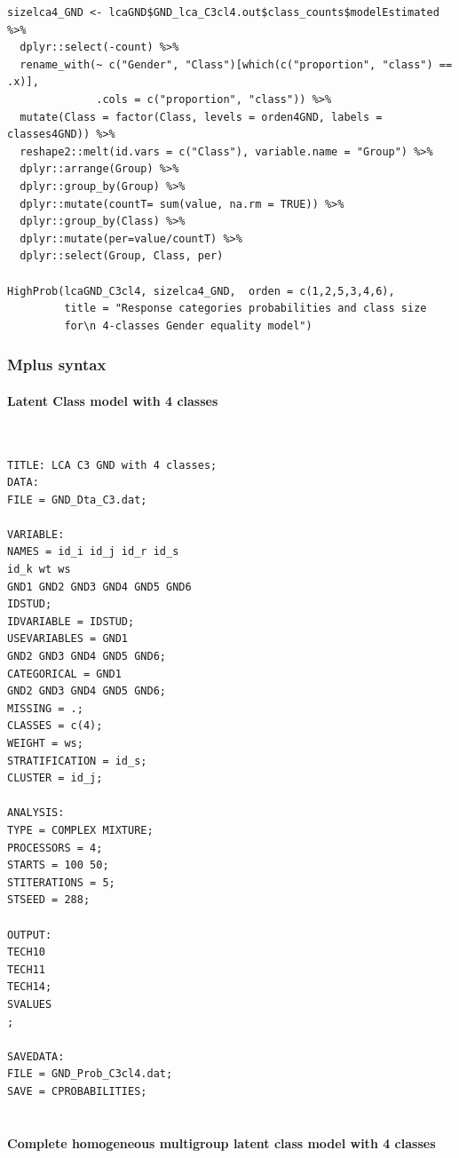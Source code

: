 \documentclass[12pt,a4paper,oneside]{reedthesis}
\begin{document}
\begin{verbatim}
sizelca4_GND <- lcaGND$GND_lca_C3cl4.out$class_counts$modelEstimated %>% 
  dplyr::select(-count) %>% 
  rename_with(~ c("Gender", "Class")[which(c("proportion", "class") == .x)], 
              .cols = c("proportion", "class")) %>% 
  mutate(Class = factor(Class, levels = orden4GND, labels = classes4GND)) %>% 
  reshape2::melt(id.vars = c("Class"), variable.name = "Group") %>% 
  dplyr::arrange(Group) %>% 
  dplyr::group_by(Group) %>%
  dplyr::mutate(countT= sum(value, na.rm = TRUE)) %>%
  dplyr::group_by(Class) %>%
  dplyr::mutate(per=value/countT) %>% 
  dplyr::select(Group, Class, per) 

HighProb(lcaGND_C3cl4, sizelca4_GND,  orden = c(1,2,5,3,4,6), 
         title = "Response categories probabilities and class size 
         for\n 4-classes Gender equality model")  
\end{verbatim}
\hypertarget{mplus-syntax}{%
\subsubsection{Mplus syntax}\label{mplus-syntax}}

\hypertarget{latent-class-model-with-4-classes}{%
\paragraph{Latent Class model with 4 classes}\label{latent-class-model-with-4-classes}}

~
\begin{verbatim}
TITLE: LCA C3 GND with 4 classes;
DATA: 
FILE = GND_Dta_C3.dat;

VARIABLE: 
NAMES = id_i id_j id_r id_s
id_k wt ws
GND1 GND2 GND3 GND4 GND5 GND6
IDSTUD;
IDVARIABLE = IDSTUD;
USEVARIABLES = GND1
GND2 GND3 GND4 GND5 GND6;
CATEGORICAL = GND1
GND2 GND3 GND4 GND5 GND6;
MISSING = .;
CLASSES = c(4);
WEIGHT = ws;
STRATIFICATION = id_s;
CLUSTER = id_j;
 
ANALYSIS:
TYPE = COMPLEX MIXTURE;
PROCESSORS = 4;
STARTS = 100 50;
STITERATIONS = 5;
STSEED = 288;
 
OUTPUT: 
TECH10
TECH11
TECH14;
SVALUES
;

SAVEDATA:
FILE = GND_Prob_C3cl4.dat;
SAVE = CPROBABILITIES;
 
\end{verbatim}
\hypertarget{complete-homogeneous-multigroup-latent-class-model-with-4-classes}{%
\paragraph{Complete homogeneous multigroup latent class model with 4 classes}\label{complete-homogeneous-multigroup-latent-class-model-with-4-classes}}
\end{document}
